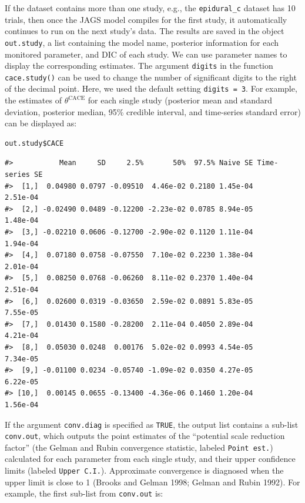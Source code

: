 If the dataset contains more than one study, e.g., the \texttt{epidural\_c} dataset has 10 trials, then once the \textsf{JAGS} model compiles for the first study, it automatically continues to run on the next study's data. The results are saved in the object \texttt{out.study}, a list containing the model name, posterior information for each monitored parameter, and DIC of each study.
We can use parameter names to display the corresponding estimates.
The argument \texttt{digits} in the function \texttt{cace.study()} can be used to change the number of significant digits to the right of the decimal point. Here, we used the default setting \texttt{digits\ =\ 3}.
For example, the estimates of \(\theta^\text{CACE}\) for each single study (posterior mean and standard deviation, posterior median, 95\% credible interval, and time-series standard error) can be displayed as:

\begin{verbatim}
out.study$CACE
\end{verbatim}

\begin{verbatim}
#>           Mean     SD     2.5%       50%  97.5% Naive SE Time-series SE
#>  [1,]  0.04980 0.0797 -0.09510  4.46e-02 0.2180 1.45e-04       2.51e-04
#>  [2,] -0.02490 0.0489 -0.12200 -2.23e-02 0.0785 8.94e-05       1.48e-04
#>  [3,] -0.02210 0.0606 -0.12700 -2.90e-02 0.1120 1.11e-04       1.94e-04
#>  [4,]  0.07180 0.0758 -0.07550  7.10e-02 0.2230 1.38e-04       2.01e-04
#>  [5,]  0.08250 0.0768 -0.06260  8.11e-02 0.2370 1.40e-04       2.51e-04
#>  [6,]  0.02600 0.0319 -0.03650  2.59e-02 0.0891 5.83e-05       7.55e-05
#>  [7,]  0.01430 0.1580 -0.28200  2.11e-04 0.4050 2.89e-04       4.21e-04
#>  [8,]  0.05030 0.0248  0.00176  5.02e-02 0.0993 4.54e-05       7.34e-05
#>  [9,] -0.01100 0.0234 -0.05740 -1.09e-02 0.0350 4.27e-05       6.22e-05
#> [10,]  0.00145 0.0655 -0.13400 -4.36e-06 0.1460 1.20e-04       1.56e-04
\end{verbatim}

If the argument \texttt{conv.diag} is specified as \texttt{TRUE}, the output list contains a sub-list \texttt{conv.out}, which outputs the point estimates of the ``potential scale reduction factor'' (the Gelman and Rubin convergence statistic, labeled \texttt{Point\ est.}) calculated for each parameter from each single study, and their upper confidence limits (labeled \texttt{Upper\ C.I.}).
Approximate convergence is diagnosed when the upper limit is close to 1 (Brooks and Gelman 1998; Gelman and Rubin 1992).
For example, the first sub-list from \texttt{conv.out} is:

